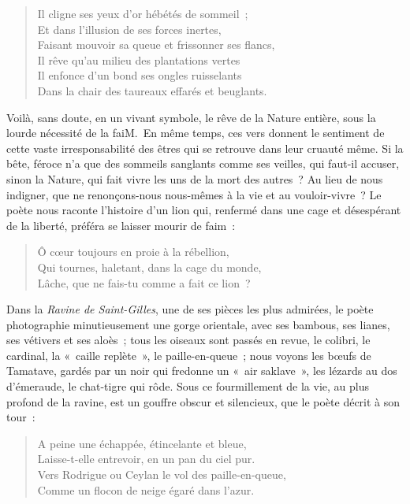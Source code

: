 \documentclass[french,twoside]{book} %
\begin{document}
\begin{verse}
Il cligne ses yeux d’or hébétés de sommeil ;\\
Et dans l’illusion de ses forces inertes,\\
Faisant mouvoir sa queue et frissonner ses flancs,\\
Il rêve qu’au milieu des plantations vertes\\
Il enfonce d’un bond ses ongles ruisselants\\
Dans la chair des taureaux effarés et beuglants.\\
\end{verse}

\noindent Voilà, sans doute, en un vivant symbole, le rêve de la Nature entière, sous la lourde nécessité de la faiM. En même temps, ces vers donnent le sentiment de cette vaste irresponsabilité des êtres qui se retrouve dans leur cruauté même. Si la bête, féroce n’a que des sommeils sanglants comme ses veilles, qui faut-il accuser, sinon la Nature, qui fait vivre les uns de la mort des autres ? Au lieu de nous indigner, que ne renonçons-nous nous-mêmes à la vie et au vouloir-vivre ? Le poète nous raconte l’histoire d’un lion qui, renfermé dans une cage et désespérant de la liberté, préféra se laisser mourir de faim :\par


\begin{verse}
Ô cœur toujours en proie à la rébellion,\\
Qui tournes, haletant, dans la cage du monde,\\
Lâche, que ne fais-tu comme a fait ce lion ?\\
\end{verse}

\noindent Dans la \emph{Ravine de Saint-Gilles}, une de ses pièces les plus admirées, le poète photographie minutieusement une gorge orientale, avec ses bambous, ses lianes, ses vétivers et ses aloès ; tous les oiseaux sont passés en revue, le colibri, le cardinal, la « caille replète », le paille-en-queue ; nous voyons les bœufs de Tamatave, gardés par un noir qui fredonne un « air saklave », les lézards au dos d’émeraude, le chat-tigre qui rôde. Sous ce fourmillement de la vie, au plus profond de la ravine, est un gouffre obscur et silencieux, que le poète décrit à son tour :\par


\begin{verse}
A peine une échappée, étincelante et bleue,\\
Laisse-t-elle entrevoir, en un pan du ciel pur.\\
Vers Rodrigue ou Ceylan le vol des paille-en-queue,\\
Comme un flocon de neige égaré dans l’azur.\\
\end{verse}
\end{document}
